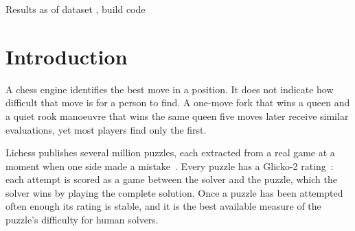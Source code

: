 \documentclass[11pt]{article}
\begin{document}
  {Results as of \quad\textperiodcentered\quad dataset ,
   build \quad\textperiodcentered\quad code }

\begin{abstract}
The rating of a Lichess puzzle measures how difficult the puzzle is for human
solvers: a solver with the same rating is expected to solve it about half of
the time. We train models that predict this rating from a puzzle's position
and its solution, so that a tactic without a rating, such as one missed in a
player's own game, can be placed on the same scale. The dataset contains
 puzzles with stable ratings, split by the game each puzzle was
extracted from. We compare a constant baseline, gradient-boosted decision
trees (GBDT) on hand-crafted features, and convolutional and transformer
networks that read the board as 64 square tokens. The best of
 models is a transformer that also receives the hand-crafted
features and whose encoder is pretrained on engine evaluations. On
 test puzzles its root-mean-square error (RMSE) is
 rating points (95\% CI  to
), compared with  for the GBDT baseline
and  for the constant baseline. Compared with the GBDT
baseline,  are significantly better. The best model
ranks puzzles well, with a Spearman correlation of , but its
mean absolute error is  rating points. Its predictions are
therefore suitable for ordering tactics by difficulty and not yet for
reporting the rating of an individual tactic.
\end{abstract}

\section{Introduction}
\label{sec:intro}

A chess engine identifies the best move in a position. It does not indicate
how difficult that move is for a person to find. A one-move fork that wins a
queen and a quiet rook manoeuvre that wins the same queen five moves later
receive similar evaluations, yet most players find only the first.

Lichess publishes several million puzzles, each extracted from a real game at
a moment when one side made a mistake~\cite{lichessdb}. Every puzzle has a
Glicko-2 rating~\cite{glicko2}: each attempt is scored as a game between the
solver and the puzzle, which the solver wins by playing the complete
solution. Once a puzzle has been attempted often enough its rating is stable,
and it is the best available measure of the puzzle's difficulty for human
solvers.
\end{document}
